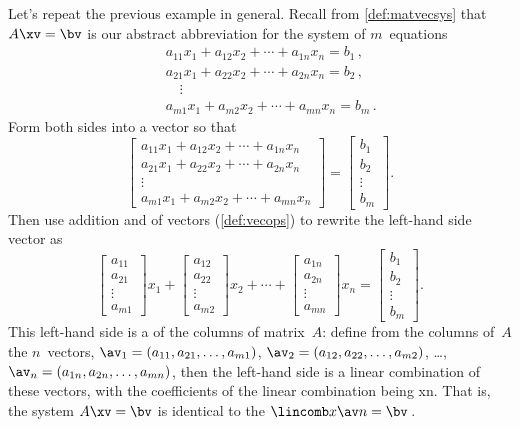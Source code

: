 \begin{example} \label{eg:lcmatvec}
Let's repeat the previous example in general.
Recall from \autoref{def:matvecsys} that \(A\xv=\bv\) is our abstract abbreviation for the system of \(m\)~equations
\begin{eqnarray*}
&&a_{11}x_1+a_{12}x_2+\cdots+a_{1n}x_n=b_1\,,
\\&&a_{21}x_1+a_{22}x_2+\cdots+a_{2n}x_n=b_2\,,
\\&&\quad\vdots
\\&&a_{m1}x_1+a_{m2}x_2+\cdots+a_{mn}x_n=b_m\,.
\end{eqnarray*}
Form both sides into a vector so that
\begin{equation*}
\begin{bmatrix} 
a_{11}x_1+a_{12}x_2+\cdots+a_{1n}x_n
\\a_{21}x_1+a_{22}x_2+\cdots+a_{2n}x_n
\\\vdots
\\a_{m1}x_1+a_{m2}x_2+\cdots+a_{mn}x_n
\end{bmatrix}
=\begin{bmatrix}b_1\\b_2\\\vdots\\b_m \end{bmatrix}.
\end{equation*}
Then use addition and  of vectors (\autoref{def:vecops}) to rewrite the left-hand side vector as
\begin{equation*}
\begin{bmatrix} a_{11}\\a_{21}\\\vdots\\a_{m1}\end{bmatrix}x_1
+\begin{bmatrix} a_{12}\\a_{22}\\\vdots\\a_{m2}\end{bmatrix}x_2
+\cdots
+\begin{bmatrix} a_{1n}\\a_{2n}\\\vdots\\a_{mn}\end{bmatrix}x_n
=\begin{bmatrix} b_1\\b_2\\\vdots\\b_m \end{bmatrix}.
\end{equation*}
This left-hand side is a  of the columns of matrix~\(A\): define from the columns of~\(A\) the \(n\)~vectors, \(\av_1=(a_{11},a_{21},\ldots,a_{m1})\), \(\av_2=(a_{12},a_{22},\ldots,a_{m2})\), \ldots, \(\av_n=(a_{1n},a_{2n},\ldots,a_{mn})\), then the left-hand side is a linear combination of these vectors, with the coefficients of the linear combination being \hlist xn.
That is, the system \(A\xv=\bv\) is identical to the  \(\lincomb x\av n=\bv\)\,.
\end{example}

